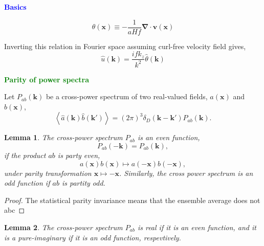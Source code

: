 \documentclass[a4paper,11pt, fleqn]{article}
\newtheorem{lemma}{Lemma}
\begin{document}
%
%
%
\newpage

{\Huge \textbf{\textcolor{Blue}{Basics}}}

\begin{equation}
  \theta(\bm{x}) \equiv - \frac{1}{aHf} \bm{\nabla}\cdot\bm{v}(\bm{x})
\end{equation}

Inverting this relation in Fourier space assuming curl-free velocity
field gives,
\begin{equation}
  \hat{u}(\bm{k}) = \frac{ifk_z}{k^2} \hat{\theta}(\bm{k})
\end{equation}

%
%
\newpage

{\Huge \textbf{\textcolor{Green}{Parity of power spectra}}}
\vspace{10mm}

Let $P_{ab}(\bm{k})$ be a cross-power spectrum of two real-valued
fields, $a(\bm{x})$ and $b(\bm{x})$,
%
\begin{equation}
  \left\langle \hat{a}(\bm{k}) \hat{b}(\bm{k}') \right\rangle
  = (2\pi)^3 \delta_D(\bm{k} - \bm{k}') P_{ab}(\bm{k}).
\end{equation}

\vspace{5mm}
\begin{lemma}
  The cross-power spectrum $P_{ab}$ is an even function,
  \begin{equation}
    P_{ab}(-\bm{k}) = P_{ab}(\bm{k}),
  \end{equation}
  if the product $ab$ is party even,
  \begin{equation}
    a(\bm{x}) b(\bm{x}) \mapsto a(-\bm{x}) b(-\bm{x}),
  \end{equation}
  under parity transformation $\bm{x} \mapsto -\bm{x}$. Similarly, the
  cross power spectrum is an odd function if $ab$ is partity odd.
\end{lemma}

\begin{proof}
  The statistical parity invariance means that the ensemble average does not
  abc
\end{proof}

\vspace{5mm}
\begin{lemma}
  The cross-power spectrum $P_{ab}$ is real if it is an even function,
  and it is a pure-imaginary if it is an odd function, respevtively.
\end{lemma}
\end{document}
